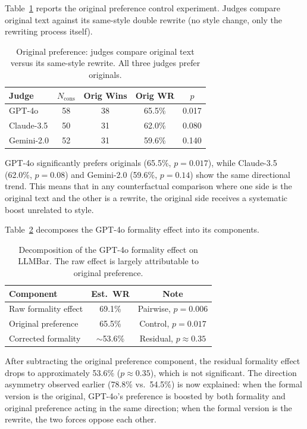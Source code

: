 \documentclass[11pt,a4paper]{article}
\begin{document}
Table~\ref{tab:original-pref} reports the original preference control experiment.
Judges compare original text against its same-style double rewrite (no style change, only the rewriting process itself).

\begin{table}[t]
\centering
\caption{Original preference: judges compare original text versus its same-style rewrite. All three judges prefer originals.}
\label{tab:original-pref}
\small
\begin{tabular}{lcccc}
\toprule
\textbf{Judge} & \textbf{$N_\text{cons}$} & \textbf{Orig Wins} & \textbf{Orig WR} & \textbf{$p$} \\
\midrule
GPT-4o & 58 & 38 & 65.5\% & 0.017 \\
Claude-3.5 & 50 & 31 & 62.0\% & 0.080 \\
Gemini-2.0 & 52 & 31 & 59.6\% & 0.140 \\
\bottomrule
\end{tabular}
\end{table}

GPT-4o significantly prefers originals (65.5\%, $p=0.017$), while Claude-3.5 (62.0\%, $p=0.08$) and Gemini-2.0 (59.6\%, $p=0.14$) show the same directional trend.
This means that in any counterfactual comparison where one side is the original text and the other is a rewrite, the original side receives a systematic boost unrelated to style.

Table~\ref{tab:decomposition} decomposes the GPT-4o formality effect into its components.

\begin{table}[t]
\centering
\caption{Decomposition of the GPT-4o formality effect on LLMBar. The raw effect is largely attributable to original preference.}
\label{tab:decomposition}
\small
\begin{tabular}{lcc}
\toprule
\textbf{Component} & \textbf{Est.\ WR} & \textbf{Note} \\
\midrule
Raw formality effect & 69.1\% & Pairwise, $p=0.006$ \\
Original preference & 65.5\% & Control, $p=0.017$ \\
Corrected formality & $\sim$53.6\% & Residual, $p \approx 0.35$ \\
\bottomrule
\end{tabular}
\end{table}

After subtracting the original preference component, the residual formality effect drops to approximately 53.6\% ($p \approx 0.35$), which is not significant.
The direction asymmetry observed earlier (78.8\% vs.\ 54.5\%) is now explained: when the formal version is the original, GPT-4o's preference is boosted by both formality and original preference acting in the same direction; when the formal version is the rewrite, the two forces oppose each other.
\end{document}
